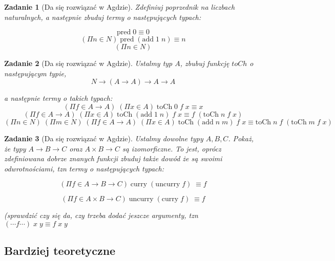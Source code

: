 \documentclass[11pt, a4paper]{article}
\newtheorem{zadanie}{Zadanie}
\begin{document}
\begin{zadanie}[Da się rozwiązać w Agdzie]
 Zdefiniuj poprzednik na liczbach naturalnych, a następnie zbuduj termy o następujących typach:

\[
  \mbox{pred}\;0 \equiv 0
\]
\[
  (\Pi n \in N)\;  \mbox{pred}\;(\mbox{add}\;1\;n) \equiv n
\]
\[
 (\Pi n \in N) 
\]

\end{zadanie}


\begin{zadanie}[Da się rozwiązać w Agdzie]
 Ustalmy typ $A$, zbubuj funkcję $toCh$ o następującym typie,
\[
  N \to (A \to A) \to A \to A
\]

a następnie termy o takich typach:
\[
 (\Pi f \in A \to A)\;(\Pi x \in A)\;\mbox{toCh}\;0\;f\;x \equiv x
\]
\[
 (\Pi f \in A \to A)\;(\Pi x \in A)\;\mbox{toCh}\;(\mbox{add}\;1\;n)\;f\;x \equiv f\;(\mbox{toCh}\;n\;f\;x)
\]
\[
 (\Pi n \in N)\;(\Pi m \in N)\;(\Pi f \in A \to A)\;(\Pi x \in A)\;
\mbox{toCh}\;(\mbox{add}\;n\;m)\;f\;x
\equiv
\mbox{toCh}\;n\;f\;(\mbox{toCh}\;m\;f\;x)
\]

\end{zadanie}


\begin{zadanie}[Da się rozwiązać w Agdzie]
 Ustalmy dowolne typy $A, B, C$.
 Pokaż, że typy $A \to B \to C$ oraz $A \times B \to C$ są izomorficzne. To jest, oprócz zdefiniowana dobrze
znanych funkcji zbuduj także dowód że są swoimi odwrotnościami, tzn termy o następujących typach:

\[
(\Pi f \in A \to B \to C)\; \mbox{curry}\; (\mbox{uncurry}\; f)\; \equiv f
\]

\[
(\Pi f \in A \times B \to C)\; \mbox{uncurry}\; (\mbox{curry}\; f)\; \equiv f
\]



(sprawdzić czy się da, czy trzeba dodać jeszcze argumenty, tzn $ (\cdots f \cdots )\;x\;y \equiv f \;x\;y$
\end{zadanie}

\subsection{Bardziej teoretyczne}
\end{document}
